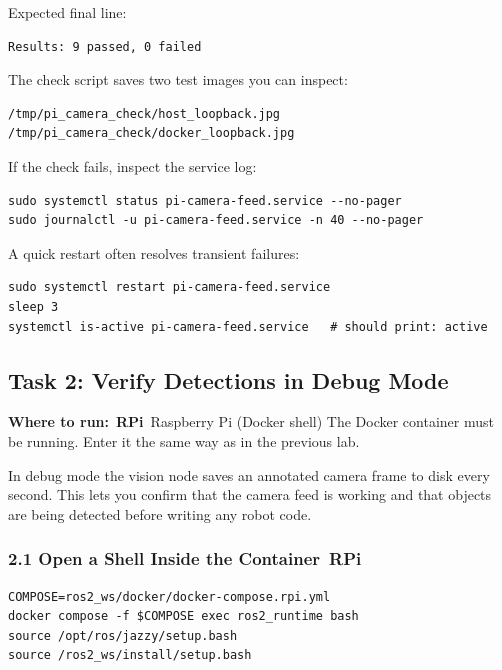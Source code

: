 \documentclass{ol-softwaremanual}
\newcommand{\onrpi}{%
  \,\colorbox{blue!20}{\footnotesize\sffamily\bfseries RPi}}
\newcommand{\machinebox}[2]{%
  \par\noindent
  \colorbox{gray!12}{\parbox{\dimexpr\linewidth-2\fboxsep}{%
    \small\sffamily\textbf{Where to run:} #1 \quad\textbar\quad #2}}%
  \par\smallskip}
\begin{document}
Expected final line:

\begin{verbatim}
Results: 9 passed, 0 failed
\end{verbatim}

The check script saves two test images you can inspect:

\begin{verbatim}
/tmp/pi_camera_check/host_loopback.jpg
/tmp/pi_camera_check/docker_loopback.jpg
\end{verbatim}

\noindent If the check fails, inspect the service log:

\begin{verbatim}
sudo systemctl status pi-camera-feed.service --no-pager
sudo journalctl -u pi-camera-feed.service -n 40 --no-pager
\end{verbatim}

A quick restart often resolves transient failures:

\begin{verbatim}
sudo systemctl restart pi-camera-feed.service
sleep 3
systemctl is-active pi-camera-feed.service   # should print: active
\end{verbatim}


\subsection{Task 2: Verify Detections in Debug Mode}

\machinebox{\onrpi\ Raspberry Pi (Docker shell)}{The Docker container must be running. Enter it the same way as in the previous lab.}

In debug mode the vision node saves an annotated camera frame to disk every
second.
This lets you confirm that the camera feed is working and that objects are being
detected before writing any robot code.

\subsubsection*{2.1 Open a Shell Inside the Container\onrpi}

\begin{verbatim}
COMPOSE=ros2_ws/docker/docker-compose.rpi.yml
docker compose -f $COMPOSE exec ros2_runtime bash
source /opt/ros/jazzy/setup.bash
source /ros2_ws/install/setup.bash
\end{verbatim}
\end{document}
